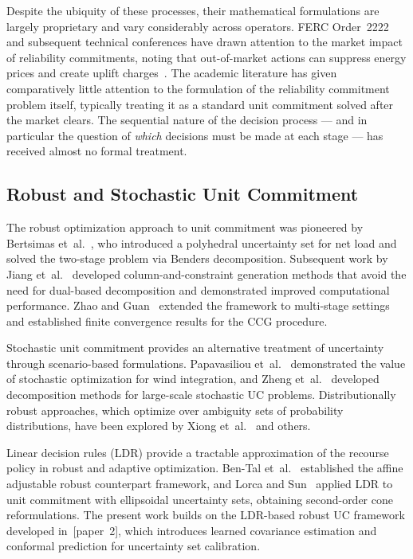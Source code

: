 \documentclass[journal]{IEEEtran}
\begin{document}
Despite the ubiquity of these processes, their mathematical
formulations are largely proprietary and vary considerably across
operators.
FERC Order~2222 and subsequent technical conferences have drawn
attention to the market impact of reliability commitments, noting
that out-of-market actions can suppress energy prices and
create uplift charges~\cite{ferc2020order2222}.
The academic literature has given comparatively little attention
to the formulation of the reliability commitment problem itself,
typically treating it as a standard unit commitment solved
after the market clears.
The sequential nature of the decision process --- and in
particular the question of \emph{which} decisions must be made
at each stage --- has received almost no formal treatment.

\subsection{Robust and Stochastic Unit Commitment}

The robust optimization approach to unit commitment was
pioneered by Bertsimas et~al.~\cite{bertsimas2013adaptive}, who
introduced a polyhedral uncertainty set for net load and solved
the two-stage problem via Benders decomposition.
Subsequent work by Jiang et~al.~\cite{jiang2012robust} developed
column-and-constraint generation methods that avoid the need for
dual-based decomposition and demonstrated improved computational
performance.
Zhao and Guan~\cite{zhao2013unified} extended the framework to
multi-stage settings and established finite convergence results
for the CCG procedure.

Stochastic unit commitment provides an alternative treatment of
uncertainty through scenario-based formulations.
Papavasiliou et~al.~\cite{papavasiliou2013multiarea} demonstrated the
value of stochastic optimization for wind integration, and
Zheng et~al.~\cite{zheng2013decomposition} developed decomposition methods
for large-scale stochastic UC problems.
Distributionally robust approaches, which optimize over
ambiguity sets of probability distributions, have been explored
by Xiong et~al.~\cite{xiong2017distributionally} and others.

Linear decision rules (LDR) provide a tractable approximation of
the recourse policy in robust and adaptive optimization.
Ben-Tal et~al.~\cite{bental2004adjustable} established the affine
adjustable robust counterpart framework, and Lorca and
Sun~\cite{lorca2016multistage, lorca2017robust} applied LDR to unit commitment with
ellipsoidal uncertainty sets, obtaining second-order cone
reformulations.
The present work builds on the LDR-based robust UC framework
developed in~[paper~2], which introduces learned covariance
estimation and conformal prediction for uncertainty set
calibration.
\end{document}
